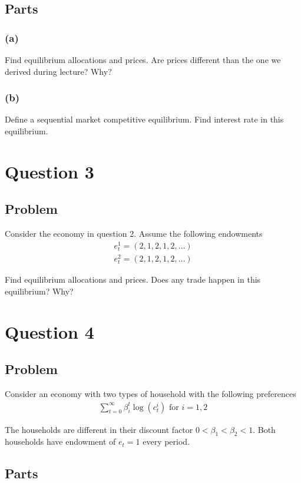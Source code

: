 \documentclass[10pt, a4paper]{article}
\begin{document}
\subsection*{Parts}
\subsubsection*{(a)}
Find equilibrium allocations and prices. Are prices different than the one we derived during lecture? Why?

\subsubsection*{(b)}
Define a sequential market competitive equilibrium. Find interest rate in this equilibrium.

\section*{Question 3}
\subsection*{Problem}
Consider the economy in question 2. Assume the following endowments
\begin{gather*}
  e^1_t = (2,1,2,1,2,\ldots)\\
  e^2_t = (2,1,2,1,2,\ldots)
\end{gather*}

Find equilibrium allocations and prices. Does any trade happen in this equilibrium? Why?

\section*{Question 4}
\subsection*{Problem}
Consider an economy with two types of household with the following preferences
\begin{gather*}
  \sum_{t=0}^{\infty} \beta_i^t \log(c^i_t) \text{ for } i = 1,2
\end{gather*}

The households are different in their discount factor $0 < \beta_1 < \beta_2 < 1$. Both households have endowment of $e_t = 1$ every period.

\subsection*{Parts}
\end{document}
